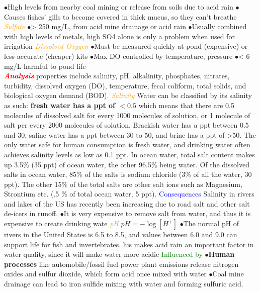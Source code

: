 \documentclass{article}
\newcommand{\ddd}{$\bullet$}
\newcommand{\red}[1]{\textcolor{red}{#1}}
\newcommand{\green}[1]{\textcolor{green}{#1}}
\newcommand{\blue}[1]{\textcolor{blue}{#1}}
\newcommand{\orange}[1]{\textcolor{orange}{#1}}
\newcommand{\mysection}[1]{\textbf{\textit{\red{#1}}}}
\newcommand{\mysubsection}[1]{{\textit{\orange{#1}}}}
\newcommand{\mysubsub}[1]{{{\green{#1}}}}
\newcommand{\mysubsubsub}[1]{{{\blue{#1}}}}
\begin{document}
\begin{multicols*}{4}
            \ddd High levels from nearby coal mining or release from soils due to acid rain
            \ddd Causes fishes’ gills to become covered in thick mucus, so they can’t breathe
        \mysubsection{Sulfate}
            \ddd > 250 mg/L, from acid mine drainage or acid rain
            \ddd Usually combined with high levels of metals, high SO4 alone is only a problem when used for irrigation
        \mysubsection{Dissolved Oxygen}
            \ddd Must be measured quickly at pond (expensive) or less accurate (cheaper) kits
            \ddd Max DO controlled by temperature, pressure
            \ddd < 6 mg/L harmful to pond life
    \\
    \mysection{Analysis}
        properties include salinity, pH, alkalinity, phosphates, nitrates, turbidity, dissolved oxygen (DO), temperature, fecal coliform, total solids, and biological oxygen demand (BOD). 
        \mysubsection{Salinity}
            Water can be classified by its salinity as such: \textbf{fresh water has a ppt of $< 0.5$} which means that there are 0.5 molecules of dissolved salt for every 1000 molecules of solution, or 1 molecule of salt per every 2000 molecules of solution. Brackish water has a ppt between 0.5 and 30, saline water has a ppt between 30 to 50, and brine has a ppt of >50. The only water safe for human consumption is fresh water, and drinking water often achieves salinity levels as low as 0.1 ppt. In ocean water, total salt content makes up 3.5\% (35 ppt) of ocean water, the other 96.5\% being water. Of the dissolved salts in ocean water, 85\% of the salts is sodium chloride (3\% of all the water, 30 ppt). The other 15\% of the total salts are other salt ions such as Magnesium, Strontium etc. (.5 \% of total ocean water, 5 ppt). 
            \mysubsubsub{Consequences}
                Salinity in rivers and lakes of the US has recently been increasing due to road salt and other salt de-icers in runoff. \ddd It is very expensive to remove salt from water, and thus it is expensive to create drinking wate
        \mysubsection{pH}
            $pH = - \log [H^+]$
            \ddd  The normal pH of rivers in the United States is 6.5 to 8.5, and values between 6.0 and 9.0 can support life for fish and invertebrates. his makes acid rain an important factor in water quality, since it will make water more acidic
            \mysubsub{Influenced by} 
            \ddd \textbf{Human processes} like automobile/fossil fuel power plant emissions release nitrogen oxides and sulfur dioxide, which form acid once mixed with water
            \ddd  Coal mine drainage can lead to iron sulfide mixing with water and forming sulfuric acid.

\end{multicols*}
\end{document}
